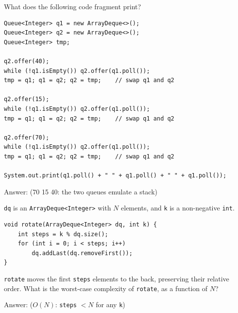 \begin{question}
What does the following code fragment print?

\begin{lstlisting}
Queue<Integer> q1 = new ArrayDeque<>();
Queue<Integer> q2 = new ArrayDeque<>();
Queue<Integer> tmp;

q2.offer(40);
while (!q1.isEmpty()) q2.offer(q1.poll());
tmp = q1; q1 = q2; q2 = tmp;    // swap q1 and q2

q2.offer(15);
while (!q1.isEmpty()) q2.offer(q1.poll());
tmp = q1; q1 = q2; q2 = tmp;    // swap q1 and q2

q2.offer(70);
while (!q1.isEmpty()) q2.offer(q1.poll());
tmp = q1; q1 = q2; q2 = tmp;    // swap q1 and q2

System.out.print(q1.poll() + " " + q1.poll() + " " + q1.poll());
\end{lstlisting}

Answer: \underline{\hspace{2in}} \ifanswers (70 15 40: the two queues emulate a stack)\fi
\end{question}

\begin{question}
\lstinline|dq| is an \lstinline|ArrayDeque<Integer>| with $N$ elements, and \lstinline|k| is a non-negative \lstinline|int|.

\begin{lstlisting}
void rotate(ArrayDeque<Integer> dq, int k) {
    int steps = k % dq.size();
    for (int i = 0; i < steps; i++)
        dq.addLast(dq.removeFirst());
}
\end{lstlisting}

\lstinline|rotate| moves the first \lstinline|steps| elements to the back, preserving their relative order. What is the worst-case complexity of \lstinline|rotate|, as a function of $N$?

Answer: \underline{\hspace{1.5in}} \ifanswers ($O(N)$: \lstinline|steps| $< N$ for any \lstinline|k|)\fi
\end{question}

